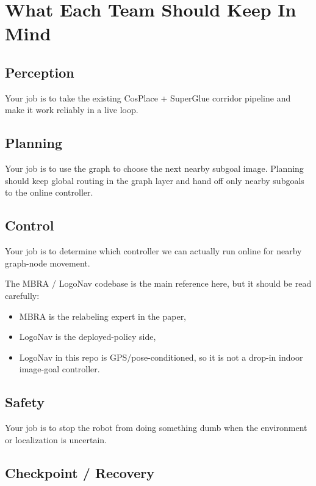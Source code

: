 \documentclass[11pt,a4paper]{article}
\begin{document}
\section{What Each Team Should Keep In Mind}

\subsection*{Perception}

Your job is to take the existing CosPlace + SuperGlue corridor pipeline and make
it work reliably in a live loop.

\subsection*{Planning}

Your job is to use the graph to choose the next nearby subgoal image.
Planning should keep global routing in the graph layer and hand off only nearby subgoals to the online controller.

\subsection*{Control}

Your job is to determine which controller we can actually run online for nearby
graph-node movement.

The MBRA / LogoNav codebase is the main reference here, but it should be read carefully:
\begin{itemize}[nosep]
  \item MBRA is the relabeling expert in the paper,
  \item LogoNav is the deployed-policy side,
  \item LogoNav in this repo is GPS/pose-conditioned, so it is not a drop-in indoor image-goal controller.
\end{itemize}

\subsection*{Safety}

Your job is to stop the robot from doing something dumb when the environment or
localization is uncertain.

\subsection*{Checkpoint / Recovery}
\end{document}
